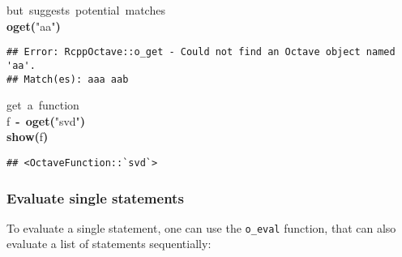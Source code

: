 \documentclass[english,10pt,a4paper]{article}\usepackage{graphicx, color}
\makeatletter
\newcommand{\hlfunctioncall}[1]{\textcolor[rgb]{0.501960784313725,0,0.329411764705882}{\textbf{#1}}}%
\newcommand{\hlstring}[1]{\textcolor[rgb]{0.6,0.6,1}{#1}}%
\newcommand{\hlkeyword}[1]{\textcolor[rgb]{0,0,0}{\textbf{#1}}}%
\newcommand{\hlcomment}[1]{\textcolor[rgb]{0.180392156862745,0.6,0.341176470588235}{#1}}%
\newcommand{\hlassignement}[1]{\textcolor[rgb]{0,0,0}{\textbf{#1}}}%
\newcommand{\hlsymbol}[1]{\textcolor[rgb]{0,0,0}{#1}}%
\newcommand{\hlstd}[1]{\textcolor[rgb]{0,0,0}{#1}}%
\newenvironment{kframe}{%
 \def\FrameCommand##1{\hskip\@totalleftmargin \hskip-\fboxsep
 \colorbox{shadecolor}{##1}\hskip-\fboxsep
     \hskip-\linewidth \hskip-\@totalleftmargin \hskip\columnwidth}%
 \MakeFramed {\advance\hsize-\width
   \@totalleftmargin\z@ \linewidth\hsize
   \@setminipage}}%
 {\par\unskip\endMakeFramed}
\newenvironment{knitrout}{}{} %
\let\code=\texttt
\makeatother
\begin{document}
\begin{knitrout}
\begin{kframe}
\begin{verbatim}
\end{verbatim}
\begin{flushleft}
\ttfamily\noindent
\hlcomment{\usebox{\hlnormalsizeboxhash}{\ }but{\ }suggests{\ }potential{\ }matches}\hspace*{\fill}\\
\hlstd{}\hlfunctioncall{o\usebox{\hlnormalsizeboxunderscore}get}\hlkeyword{(}\hlstring{"{}aa"{}}\hlkeyword{)}\mbox{}
\normalfont
\end{flushleft}
\begin{verbatim}
## Error: RcppOctave::o_get - Could not find an Octave object named 'aa'.
## Match(es): aaa aab
\end{verbatim}
\begin{flushleft}
\ttfamily\noindent
\hlcomment{\usebox{\hlnormalsizeboxhash}{\ }get{\ }a{\ }function}\hspace*{\fill}\\
\hlstd{}\hlsymbol{f}{\ }\hlassignement{\usebox{\hlnormalsizeboxlessthan}-}{\ }\hlfunctioncall{o\usebox{\hlnormalsizeboxunderscore}get}\hlkeyword{(}\hlstring{"{}svd"{}}\hlkeyword{)}\hspace*{\fill}\\
\hlstd{}\hlfunctioncall{show}\hlkeyword{(}\hlsymbol{f}\hlkeyword{)}\mbox{}
\normalfont
\end{flushleft}
\begin{verbatim}
## <OctaveFunction::`svd`>
\end{verbatim}
\end{kframe}
\end{knitrout}


\subsubsection{Evaluate single statements}

To evaluate a single statement, one can use the \code{o\_eval} function, that
can also evaluate a list of statements sequentially:
\end{document}
